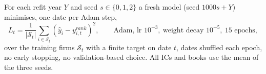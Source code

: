 For each refit year $Y$ and seed $s\in\{0,1,2\}$ a fresh model (seed $1000s+Y$) minimises, one date per Adam step,
\begin{equation}\label{eq:p13loss}
L_t=\frac1{|\mathcal S_t|}\sum_{i\in\mathcal S_t}(\hat y_i-y^{rank}_{i,t})^2,\qquad\text{Adam, lr }10^{-3},\ \text{weight decay }10^{-5},\ 15\text{ epochs},
\end{equation}
over the training firms $\mathcal S_t$ with a finite target on date $t$, dates shuffled each epoch, no early stopping, no validation-based choice. All ICs and books use the mean of the three seeds.
